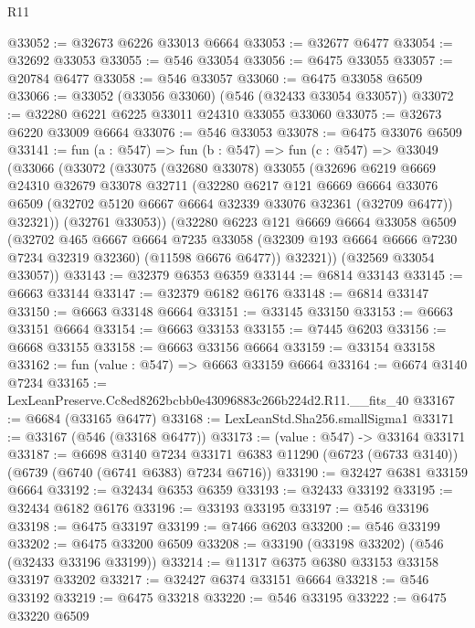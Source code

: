 \begin{lexlean}{R11}
\begin{coremodule}
@33052 := @32673 @6226 @33013 @6664
@33053 := @32677 @6477
@33054 := @32692 @33053
@33055 := @546 @33054
@33056 := @6475 @33055
@33057 := @20784 @6477
@33058 := @546 @33057
@33060 := @6475 @33058 @6509
@33066 := @33052 (@33056 @33060) (@546 (@32433 @33054 @33057))
@33072 := @32280 @6221 @6225 @33011 @24310 @33055 @33060
@33075 := @32673 @6220 @33009 @6664
@33076 := @546 @33053
@33078 := @6475 @33076 @6509
@33141 := fun (a : @547) =>
  fun (b : @547) =>
  fun (c : @547) =>
  @33049
    (@33066
      (@33072
        (@33075
          (@32680 @33078)
          @33055
          (@32696
            @6219
            @6669
            @24310
            @32679
            @33078
            @32711
            (@32280
              @6217
              @121
              @6669
              @6664
              @33076
              @6509
              (@32702 @5120 @6667 @6664 @32339 @33076 @32361 (@32709 @6477))
              @32321))
          (@32761 @33053))
        (@32280
          @6223
          @121
          @6669
          @6664
          @33058
          @6509
          (@32702
            @465
            @6667
            @6664
            @7235
            @33058
            (@32309 @193 @6664 @6666 @7230 @7234 @32319 @32360)
            (@11598 @6676 @6477))
          @32321))
      (@32569 @33054 @33057))
@33143 := @32379 @6353 @6359
@33144 := @6814 @33143
@33145 := @6663 @33144
@33147 := @32379 @6182 @6176
@33148 := @6814 @33147
@33150 := @6663 @33148 @6664
@33151 := @33145 @33150
@33153 := @6663 @33151 @6664
@33154 := @6663 @33153
@33155 := @7445 @6203
@33156 := @6668 @33155
@33158 := @6663 @33156 @6664
@33159 := @33154 @33158
@33162 := fun (value : @547) => @6663 @33159 @6664
@33164 := @6674 @3140 @7234
@33165 := LexLeanPreserve.Cc8ed8262bcbb0e43096883c266b224d2.R11.__fits_40
@33167 := @6684 (@33165 @6477)
@33168 := LexLeanStd.Sha256.smallSigma1
@33171 := @33167 (@546 (@33168 @6477))
@33173 := (value : @547) -> @33164 @33171
@33187 := @6698
    @3140
    @7234
    @33171
    @6383
    @11290
    (@6723 (@6733 @3140))
    (@6739 (@6740 (@6741 @6383) @7234 @6716))
@33190 := @32427 @6381 @33159 @6664
@33192 := @32434 @6353 @6359
@33193 := @32433 @33192
@33195 := @32434 @6182 @6176
@33196 := @33193 @33195
@33197 := @546 @33196
@33198 := @6475 @33197
@33199 := @7466 @6203
@33200 := @546 @33199
@33202 := @6475 @33200 @6509
@33208 := @33190 (@33198 @33202) (@546 (@32433 @33196 @33199))
@33214 := @11317 @6375 @6380 @33153 @33158 @33197 @33202
@33217 := @32427 @6374 @33151 @6664
@33218 := @546 @33192
@33219 := @6475 @33218
@33220 := @546 @33195
@33222 := @6475 @33220 @6509

\end{coremodule}
\end{lexlean}
